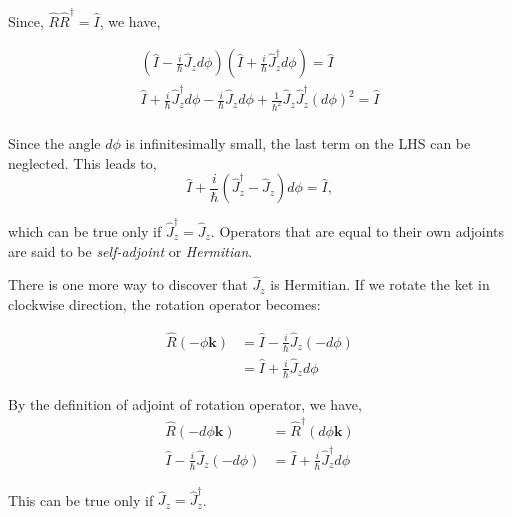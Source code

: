Since, $\hat{R} \hat{R}^{\dagger} =\hat{I}$, we have,

\begin{equation*}
\begin{aligned}
\left(\hat{I}-\frac{i}{\hbar} \hat{J}_{z} d \phi\right)\left(\hat{I}+\frac{i}{\hbar} \hat{J}_{z}^{\dagger} d \phi\right)=\hat{I}\\
%
\hat{I}+\frac{i}{\hbar} \hat{J}_{z}^{\dagger} d \phi-\frac{i}{\hbar} \hat{J}_{z} d \phi+\frac{1}{\hbar^{2}} \hat{J}_{z} \hat{J}_{z}^{\dagger}(d \phi)^{2}= \hat{I}\\
\end{aligned}
\end{equation*}

Since the angle $d\phi$ is infinitesimally small, the last term on the LHS 
can be neglected. This leads to,
\begin{equation}
\hat{I}+\frac{i}{\hbar}\left(\hat{J}_{z}^{\dagger}-\hat{J}_{z}\right) d \phi=\hat{I},
\end{equation}

which can be true only if $\hat{J}_{z}^{\dagger}=\hat{J}_{z}$. Operators that are
equal to their own adjoints are said to be \emph{self-adjoint} or \emph{Hermitian}.

There is one more way to discover that $\hat J_{z}$ is Hermitian. If we rotate 
the ket in clockwise direction, the rotation operator becomes:

\begin{equation}
\begin{aligned}
\hat{R}(- \phi \mathbf{k}) & = \hat{I}-\frac{i}{\hbar} \hat{J}_{z} (- d \phi) \\
	& = \hat{I}+\frac{i}{\hbar} \hat{J}_{z} d \phi
\end{aligned}
\end{equation}

By the definition of adjoint of rotation operator, we have,
\begin{equation}
\begin{aligned}
\hat{R}(- d \phi \mathbf{k}) &= \hat{R}^{\dagger}(d \phi \mathbf{k}) \\
	\hat{I}-\frac{i}{\hbar} \hat{J}_{z} (- d \phi) &= \hat{I}+\frac{i}{\hbar} \hat{J}_{z}^{\dagger} d \phi
\end{aligned}
\end{equation}

This can be true only if $\hat{J}_{z} = \hat{J}_{z}^{\dagger}$.
